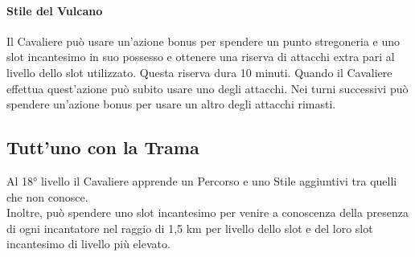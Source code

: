 \paragraph{Stile del Vulcano} Il Cavaliere può usare un'azione bonus per spendere un punto stregoneria e uno slot incantesimo in suo possesso e ottenere una riserva di attacchi extra pari al livello dello slot utilizzato. Questa riserva dura 10 minuti. Quando il Cavaliere effettua quest'azione può subito usare uno degli attacchi. Nei turni successivi può spendere un'azione bonus per usare un altro degli attacchi rimasti.

\subsection{Tutt'uno con la Trama}
Al 18° livello il Cavaliere apprende un Percorso e uno Stile aggiuntivi tra quelli che non conosce.
\\ Inoltre, può spendere uno slot incantesimo per venire a conoscenza della presenza di ogni incantatore nel raggio di 1,5 km per livello dello slot e del loro slot incantesimo di livello più elevato.